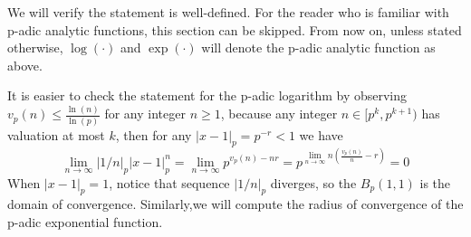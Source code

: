 We will verify the statement is well-defined. For the reader who is familiar with p-adic analytic functions, this section can be skipped. From now on, unless stated otherwise, \(\log(\cdot)\) and \(\exp(\cdot)\) will denote the p-adic analytic function as above. \newline 

It is easier to check the statement for the p-adic logarithm by observing \(v_p(n) \leq \frac{\ln(n)}{\ln(p)}\) for any integer \(n \geq 1\), because any integer \(n \in [p^k,p^{k+1})\) has valuation at most \(k\), then for any \(|x-1|_p = p^{-r} < 1\) we have
\[ \lim_{n \rightarrow \infty} |1/n|_p |x-1|_p^n =\lim_{n \rightarrow \infty} p^{v_p(n)-nr} = p^{\lim_{n \rightarrow \infty}n(\frac{v_p(n)}{n}-r)} = 0\]
When \(|x-1|_p = 1\), notice that sequence \(|1/n|_p\) diverges, so the \(B_p(1,1)\) is the domain of convergence. Similarly,we will compute the radius of convergence of the p-adic exponential function.

